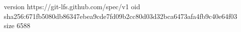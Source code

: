 version https://git-lfs.github.com/spec/v1
oid sha256:671fb5080db86347ebea9cde7fd09b2cc80d03d32bca6473afa4fb9c40e64f03
size 6588
